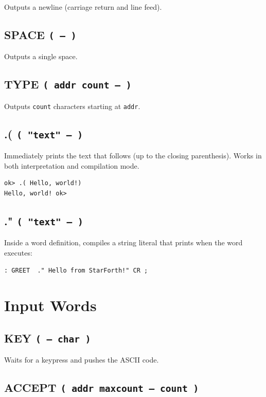 Outputs a newline (carriage return and line feed).

\subsection*{SPACE \texttt{( -- )}}

Outputs a single space.

\subsection*{TYPE \texttt{( addr count -- )}}

Outputs \texttt{count} characters starting at \texttt{addr}.

\subsection*{.( \texttt{( "text" -- )}}

Immediately prints the text that follows (up to the closing parenthesis).
Works in both interpretation and compilation mode.

\begin{lstlisting}[language=Forth]
ok> .( Hello, world!)
Hello, world! ok>
\end{lstlisting}

\subsection*{." \texttt{( "text" -- )}}

Inside a word definition, compiles a string literal that prints when the word
executes:

\begin{lstlisting}[language=Forth]
: GREET  ." Hello from StarForth!" CR ;
\end{lstlisting}

\section{Input Words}
\label{sec:input}

\subsection*{KEY \texttt{( -- char )}}

Waits for a keypress and pushes the ASCII code.

\subsection*{ACCEPT \texttt{( addr maxcount -- count )}}

